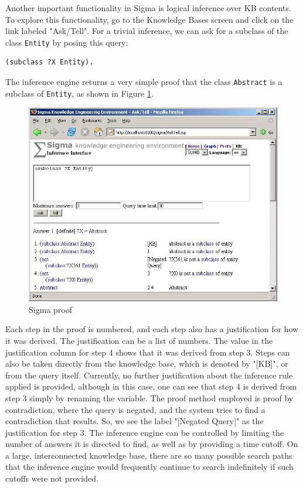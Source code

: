 \documentclass{book}
\begin{document}
Another important
functionality in Sigma is logical inference over KB contents.  To explore
this functionality, go to the Knowledge Bases screen and click on the link
labeled "Ask/Tell".  For a trivial inference, we can ask for a subclass of the
class {\tt Entity} by posing this query:

\begin{verbatim}
(subclass ?X Entity).  
\end{verbatim}

The inference engine returns a very simple proof that the class {\tt Abstract} is a
subclass of {\tt Entity}, as shown in Figure \ref{fig:Proof}.

\begin{figure}
  \centering
  \includegraphics[width=4.5in]{pictures/Proof2.jpg}
  \caption{Sigma proof}
  \label{fig:Proof}
\end{figure}

Each step in the proof is numbered, and each step also has a justification for
how it was derived.  The justification can be a list of numbers.  The value in
the justification column for step 4 shows that it was derived from step 3.
Steps can also be taken directly from the knowledge base, which is denoted by
"[KB]", or from the query itself.  Currently, no further justification about
the inference rule applied is provided, although in this case, one can see that
step 4 is derived from step 3 simply by renaming the variable.  The proof method
employed is proof by contradiction, where the query is negated, and the system
tries to find a contradiction that results.  So, we see the label "[Negated
Query]" as the justification for step 3. The inference engine can be
controlled by limiting the number of answers it is directed to find, as well as
by providing a time cutoff.  On a large, interconnected knowledge base, there
are so many possible search paths that the inference engine would frequently
continue to search indefinitely if such cutoffs were not provided.
\end{document}
